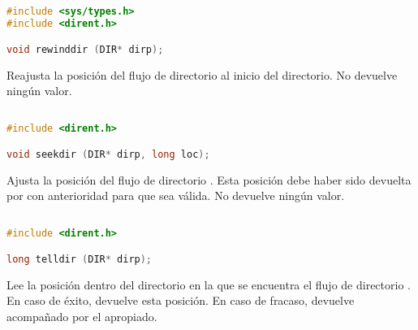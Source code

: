\subsection{}\label{rewinddir}

\begin{lstlisting}[language=C]
#include <sys/types.h>
#include <dirent.h>

void rewinddir (DIR* dirp);
\end{lstlisting}

Reajusta la posición del flujo de directorio  al inicio del directorio.
No devuelve ningún valor.

\subsection{}\label{seekdir}

\begin{lstlisting}[language=C]
#include <dirent.h>

void seekdir (DIR* dirp, long loc);
\end{lstlisting}

Ajusta la posición del flujo de directorio .
Esta posición debe haber sido devuelta por  con anterioridad para que sea válida.
No devuelve ningún valor.

\subsection{}\label{telldir}

\begin{lstlisting}[language=C]
#include <dirent.h>

long telldir (DIR* dirp);
\end{lstlisting}

Lee la posición dentro del directorio en la que se encuentra el flujo de directorio .
En caso de éxito, devuelve esta posición.
En caso de fracaso, devuelve  acompañado por el  apropiado.


